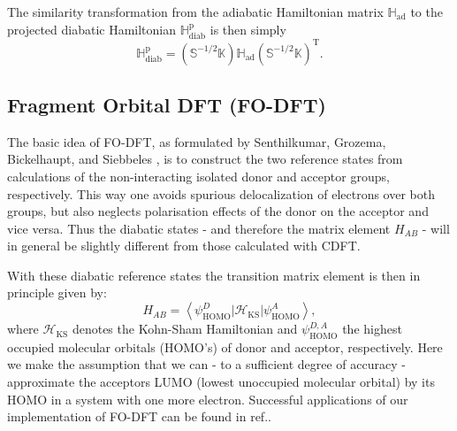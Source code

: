 \documentclass[twoside,10pt,titlepage,a4paper]{article}
\begin{document}
The similarity transformation from the adiabatic Hamiltonian matrix $\mathbb{H}_\text{ad}$ to the projected diabatic Hamiltonian $\mathbb{H}^\text{p}_\text{diab}$ is then simply
\begin{equation}
\mathbb{H}^\text{p}_\text{diab}= (\mathbb{S}^{-1/2} \mathbb{K}) \mathbb{H}_\text{ad} (\mathbb{S}^{-1/2} \mathbb{K})^\text{T}.
\end{equation}

\subsection{Fragment Orbital DFT (FO-DFT)}
The basic idea of FO-DFT, as formulated by Senthilkumar, Grozema, Bickelhaupt, and Siebbeles
\cite{Senthilkumar03}, is to construct the two reference states from calculations of the
non-interacting isolated donor and acceptor groups, respectively. This way one avoids spurious
delocalization of electrons over both groups, but also neglects polarisation effects of the donor on
the acceptor and vice versa. Thus the diabatic states - and therefore the matrix element $H_{AB}$ -
will in general be slightly different from those calculated with CDFT.

With these diabatic reference states the transition matrix element is then in principle given by:
\begin{equation}
H_{AB}= \left\langle \psi^D_\text{HOMO}\left\vert \mathcal{H}_\text{KS} \right\vert\psi^A_\text{HOMO}\right\rangle,
\end{equation}
where $\mathcal{H}_\text{KS}$ denotes the Kohn-Sham Hamiltonian and $\psi^{D,A}_\text{HOMO}$ the
highest occupied molecular orbitals (HOMO's) of donor and acceptor, respectively. Here we make the
assumption that we can - to a sufficient degree of accuracy - approximate the acceptors LUMO (lowest
unoccupied molecular orbital) by its HOMO in a system with one more electron. Successful
applications of our implementation of FO-DFT can be found in ref.\cite{Oberhofer10acie}.
\end{document}
